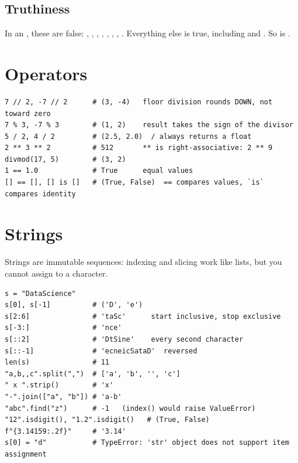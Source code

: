 \subsection{Truthiness}
In an , these are false: , , , \code{[]}, \code{\{\}}, , , . Everything else is true,
including  and \code{[0]}. So  is .

\section{Operators}
\begin{lstlisting}
7 // 2, -7 // 2      # (3, -4)   floor division rounds DOWN, not toward zero
7 % 3, -7 % 3        # (1, 2)    result takes the sign of the divisor
5 / 2, 4 / 2         # (2.5, 2.0)  / always returns a float
2 ** 3 ** 2          # 512       ** is right-associative: 2 ** 9
divmod(17, 5)        # (3, 2)
1 == 1.0             # True      equal values
[] == [], [] is []   # (True, False)  == compares values, `is` compares identity
\end{lstlisting}

\section{Strings}
Strings are immutable sequences: indexing and slicing work like lists, but you cannot assign to a character.
\begin{lstlisting}
s = "DataScience"
s[0], s[-1]          # ('D', 'e')
s[2:6]               # 'taSc'      start inclusive, stop exclusive
s[-3:]               # 'nce'
s[::2]               # 'DtSine'    every second character
s[::-1]              # 'ecneicSataD'  reversed
len(s)               # 11
"a,b,,c".split(",")  # ['a', 'b', '', 'c']
" x ".strip()        # 'x'
"-".join(["a", "b"]) # 'a-b'
"abc".find("z")      # -1   (index() would raise ValueError)
"12".isdigit(), "1.2".isdigit()   # (True, False)
f"{3.14159:.2f}"     # '3.14'
s[0] = "d"           # TypeError: 'str' object does not support item assignment
\end{lstlisting}

